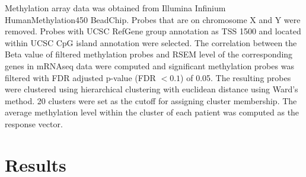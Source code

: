 \documentclass{article}
\begin{document}
Methylation array data was obtained from Illumina Infinium HumanMethylation450 BeadChip. Probes that are on chromosome X and Y were removed. Probes with UCSC RefGene group annotation as TSS 1500 and located within UCSC CpG island annotation were selected. The correlation between the Beta value of filtered methylation probes and RSEM level of the corresponding genes in mRNAseq data were computed and significant methylation probes was filtered with FDR adjusted p-value (FDR $< 0.1$) of 0.05. The resulting probes were clustered using hierarchical clustering with euclidean distance using Ward's method. 20 clusters were set as the cutoff for assigning cluster membership. The average methylation level within the cluster of each patient was computed as the response vector. 


\section{Results}
\end{document}
